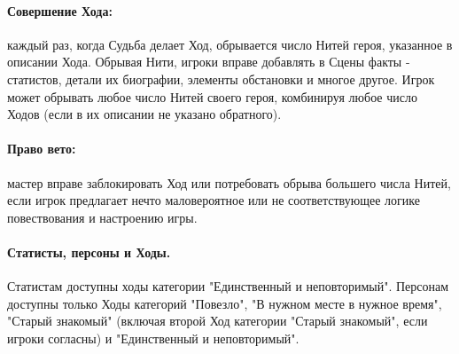 \paragraph{Совершение Хода:} каждый раз, когда Судьба делает Ход, обрывается число Нитей героя, указанное в описании Хода. Обрывая Нити, игроки вправе добавлять в Сцены факты - статистов, детали их биографии, элементы обстановки и многое другое. Игрок может обрывать любое число Нитей своего героя, комбинируя любое число Ходов (если в их описании не указано обратного).
\paragraph{Право вето:} мастер вправе заблокировать Ход или потребовать обрыва большего числа Нитей, если игрок предлагает нечто маловероятное или не соответствующее логике повествования и настроению игры.
\paragraph{Статисты, персоны и Ходы.} Статистам доступны ходы категории "Единственный и неповторимый". Персонам доступны только Ходы категорий "Повезло", "В нужном месте в нужное время", "Старый знакомый" (включая второй Ход категории "Старый знакомый", если игроки согласны) и "Единственный и неповторимый".

